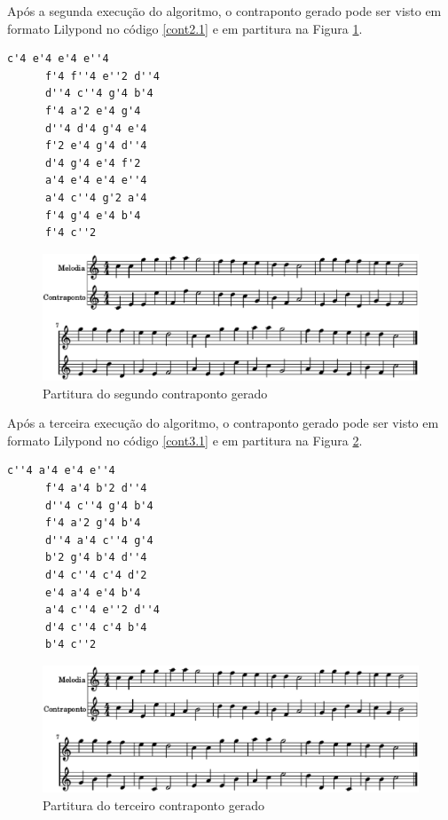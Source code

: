     Após a segunda execução do algoritmo, o contraponto gerado pode ser visto em formato Lilypond no código \ref{cont2.1} e em partitura na Figura \ref{cont2.2}.

    \begin{lstlisting}[caption={Segundo contraponto gerado}, label={cont2.1}]
      c'4 e'4 e'4 e''4
      f'4 f''4 e''2 d''4
      d''4 c''4 g'4 b'4
      f'4 a'2 e'4 g'4
      d''4 d'4 g'4 e'4
      f'2 e'4 g'4 d''4
      d'4 g'4 e'4 f'2
      a'4 e'4 e'4 e''4
      a'4 c''4 g'2 a'4
      f'4 g'4 e'4 b'4
      f'4 c''2
    \end{lstlisting}

    \begin{figure}[htb]
      \centering
      \includegraphics[scale=0.6]{figuras/cont2.2.eps}
      \caption{Partitura do segundo contraponto gerado}
      \label{cont2.2}
    \end{figure}

    Após a terceira execução do algoritmo, o contraponto gerado pode ser visto em formato Lilypond no código \ref{cont3.1} e em partitura na Figura \ref{cont3.2}.

    \begin{lstlisting}[caption={Terceiro contraponto gerado}, label={cont3.1}]
      c''4 a'4 e'4 e''4
      f'4 a'4 b'2 d''4
      d''4 c''4 g'4 b'4
      f'4 a'2 g'4 b'4
      d''4 a'4 c''4 g'4
      b'2 g'4 b'4 d''4
      d'4 c''4 c'4 d'2
      e'4 a'4 e'4 b'4
      a'4 c''4 e''2 d''4
      d'4 c''4 c'4 b'4
      b'4 c''2
    \end{lstlisting}

    \begin{figure}[htb]
      \centering
      \includegraphics[scale=0.6]{figuras/cont3.2.eps}
      \caption{Partitura do terceiro contraponto gerado}
      \label{cont3.2}
    \end{figure}
